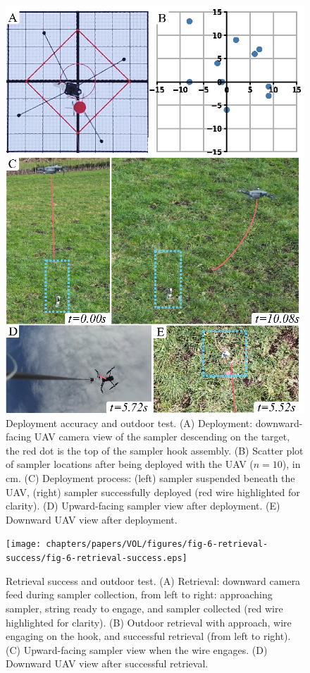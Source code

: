 \begin{figure}[!hpt]
\centering
\includegraphics[width=0.9\columnwidth]{chapters/papers/VOL/figures/fig-5-deployment-accuracy/fig-5-deployment-accuracy.eps}
\caption{Deployment accuracy and outdoor test. (A) Deployment: downward-facing UAV camera view of the sampler descending on the target, the red dot is the top of the sampler hook assembly. (B) Scatter plot of sampler locations after being deployed with the UAV ($n=10$), in cm. (C) Deployment process: (left) sampler suspended beneath the UAV, (right) sampler successfully deployed (red wire highlighted for clarity). (D) Upward-facing sampler view after deployment. (E) Downward UAV view after deployment.}
\label{fig-5-deployment-accuracy}
\end{figure}

\begin{figure}[!hpt]
\centering
\texttt{[image: chapters/papers/VOL/figures/fig-6-retrieval-success/fig-6-retrieval-success.eps]}
\caption{Retrieval success and outdoor test. (A) Retrieval: downward camera feed during sampler collection, from left to right: approaching sampler, string ready to engage, and sampler collected (red wire highlighted for clarity). (B) Outdoor retrieval with approach, wire engaging on the hook, and successful retrieval (from left to right). (C) Upward-facing sampler view when the wire engages. (D) Downward UAV view after successful retrieval.}
\label{fig-6-retrieval-success}
\end{figure}

